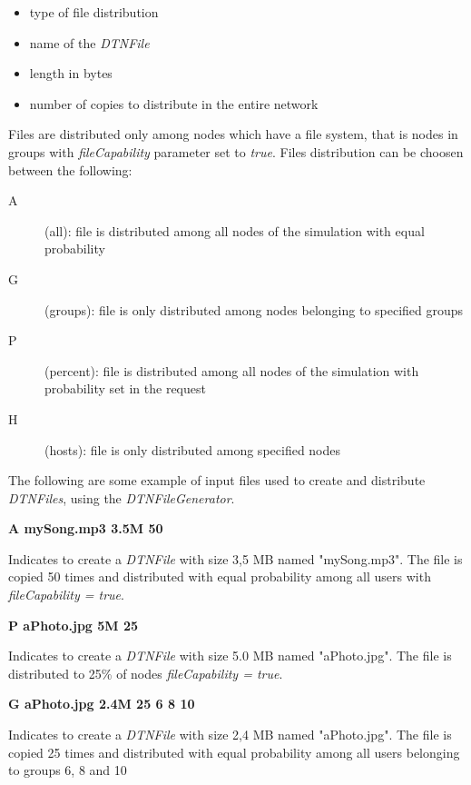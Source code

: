 \begin{itemize}
\item type of file distribution 
\item name of the \textit{DTNFile}
\item length in bytes
\item number of copies to distribute in the entire network
\end{itemize}

Files are distributed only among nodes which have a file system, that is nodes in groups with \textit{fileCapability} parameter set to \textit{true}. Files distribution can be choosen between the following:

\begin{description}
\item[A] (all): file is distributed among all nodes of the simulation with equal probability
\item[G] (groups): file is only distributed among nodes belonging to specified groups
\item[P] (percent): file is distributed among all nodes of the simulation with probability set in the request
\item[H] (hosts): file is only distributed among specified nodes  
\end{description}

The following are some example of input files used to create and distribute \textit{DTNFiles}, using the \textit{DTNFileGenerator}.

\begin{center}
\textbf{A	mySong.mp3	3.5M	50}
\end{center}
Indicates to create a \textit{DTNFile} with size 3,5 MB named "mySong.mp3". The file is copied 50 times and distributed with equal probability among all users with \textit{fileCapability = true}.
\\

\begin{center}
\textbf{P	aPhoto.jpg	5M	25}
\end{center}
Indicates to create a \textit{DTNFile} with size 5.0 MB named "aPhoto.jpg". The file is distributed to 25\% of nodes \textit{fileCapability = true}.
\\

\begin{center}
\textbf{G	aPhoto.jpg	2.4M	25	6	8	10}
\end{center}
Indicates to create a \textit{DTNFile} with size 2,4 MB named "aPhoto.jpg". The file is copied 25 times and distributed with equal probability among all users belonging to groups 6, 8 and 10
\\

